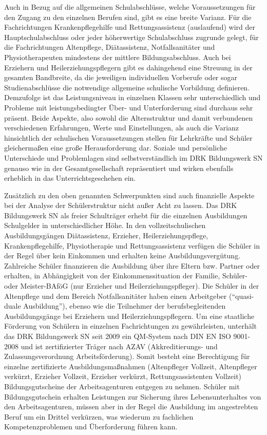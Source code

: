 Auch in Bezug auf die allgemeinen Schulabschlüsse, welche Voraussetzungen für den Zugang zu den einzelnen Berufen sind, gibt es eine breite Varianz. Für die Fachrichtungen Krankenpflegehilfe und Rettungsassistenz (auslaufend) wird der Hauptschulabschluss oder jeder höherwertige Schulabschluss zugrunde gelegt, für die Fachrichtungen Altenpflege, Diätassistenz, Notfallsanitäter und Physiotherapeuten mindestens der mittlere Bildungsabschluss. Auch bei Erziehern und Heilerziehungspflegern gibt es dahingehend eine Streuung in der gesamten Bandbreite, da die jeweiligen individuellen Vorberufe oder sogar Studienabschlüsse die notwendige allgemeine schulische Vorbildung definieren. Demzufolge ist das Leistungsniveau in einzelnen Klassen sehr unterschiedlich und Probleme mit leistungsbedingter Über- und Unterforderung sind durchaus sehr präsent. Beide Aspekte, also sowohl die Altersstruktur und damit verbundenen verschiedenen Erfahrungen, Werte und Einstellungen, als auch die Varianz hinsichtlich der schulischen Voraussetzungen stellen für Lehrkräfte und Schüler gleichermaßen eine große Herausforderung dar. Soziale und persönliche Unterschiede und Problemlagen sind selbstverständlich im DRK Bildungswerk SN genauso wie in der Gesamtgesellschaft repräsentiert und wirken ebenfalls erheblich in das Unterrichtsgeschehen ein. 

Zusätzlich zu den oben genannten Schwerpunkten sind auch finanzielle Aspekte bei der Analyse der Schülerstruktur nicht außer Acht zu lassen. Das DRK Bildungswerk SN als freier Schulträger erhebt für die einzelnen Ausbildungen Schulgelder in unterschiedlicher Höhe. In den vollzeitschulischen Ausbildungsgängen Diätassistenz, Erzieher, Heilerziehungspflege, Krankenpflegehilfe, Physiotherapie und Rettungsassistenz verfügen die Schüler in der Regel über kein Einkommen und erhalten keine Ausbildungsvergütung. Zahlreiche Schüler finanzieren die Ausbildung über ihre Eltern bzw. Partner oder erhalten, in Abhängigkeit von der Einkommenssituation der Familie, Schüler- oder Meister-BAföG (nur Erzieher und Heilerziehungspfleger). Die Schüler in der Altenpflege und dem Bereich Notfallsanitäter haben einen Arbeitgeber ("`quasi-duale Ausbildung"'), ebenso wie die Teilnehmer der berufsbegleitenden Ausbildungsgänge bei Erziehern und Heilerziehungspflegern. Um eine staatliche Förderung von Schülern in einzelnen Fachrichtungen zu gewährleisten, unterhält das DRK Bildungswerk SN seit 2009 ein QM-System nach DIN EN ISO 9001-2008 und ist zertifizierter Träger nach AZAV (Akkreditierungs- und Zulassungsverordnung Arbeitsförderung). Somit besteht eine Berechtigung für einzelne zertifizierte Ausbildungsmaßnahmen (Altenpfleger Vollzeit, Altenpfleger verkürzt, Erzieher Vollzeit, Erzieher verkürzt, Rettungsassistenten Vollzeit) Bildungsgutscheine der Arbeitsagenturen entgegen zu nehmen. Schüler mit Bildungsgutschein erhalten Leistungen zur Sicherung ihres Lebensunterhaltes von den Arbeitsagenturen, müssen aber in der Regel die Ausbildung im angestrebten Beruf um ein Drittel verkürzen, was wiederum zu fachlichen Kompetenzproblemen und Überforderung führen kann.


